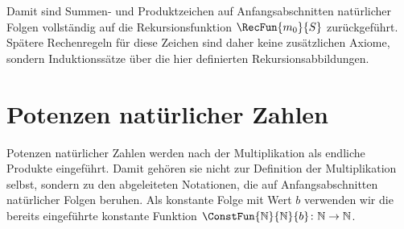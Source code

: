 \documentclass[main.tex]{subfiles}
\begin{document}

Damit sind Summen- und Produktzeichen auf Anfangsabschnitten natürlicher
Folgen vollständig auf die Rekursionsfunktion \(\RecFun{m_0}{S}\)
zurückgeführt. Spätere Rechenregeln für diese Zeichen sind daher keine
zusätzlichen Axiome, sondern Induktionssätze über die hier definierten
Rekursionsabbildungen.

\section{Potenzen natürlicher Zahlen}

Potenzen natürlicher Zahlen werden nach der Multiplikation als endliche
Produkte eingeführt. Damit gehören sie nicht zur Definition der
Multiplikation selbst, sondern zu den abgeleiteten Notationen, die auf
Anfangsabschnitten natürlicher Folgen beruhen. Als konstante Folge mit Wert
\(b\) verwenden wir die bereits eingeführte konstante Funktion
\(\ConstFun{\mathbb{N}}{\mathbb{N}}{b}\colon\mathbb{N}\to\mathbb{N}\).


\begin{tabproof}
\end{tabproof}
\end{document}
